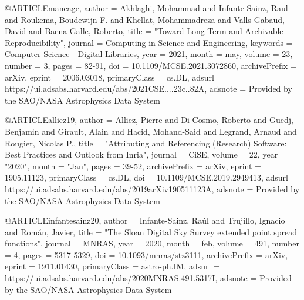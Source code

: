 %
%

@ARTICLE{maneage,
       author = {{Akhlaghi}, Mohammad and {Infante-Sainz}, Raul and
         {Roukema}, Boudewijn F. and {Khellat}, Mohammadreza and
         {Valls-Gabaud}, David and {Baena-Galle}, Roberto},
        title = "{Toward Long-Term and Archivable Reproducibility}",
      journal = {Computing in Science and Engineering},
     keywords = {Computer Science - Digital Libraries},
         year = 2021,
        month = may,
       volume = {23},
       number = {3},
        pages = {82-91},
          doi = {10.1109/MCSE.2021.3072860},
archivePrefix = {arXiv},
       eprint = {2006.03018},
 primaryClass = {cs.DL},
       adsurl = {https://ui.adsabs.harvard.edu/abs/2021CSE....23c..82A},
      adsnote = {Provided by the SAO/NASA Astrophysics Data System}
}




@ARTICLE{alliez19,
       author = {{Alliez}, Pierre and {Di Cosmo}, Roberto and {Guedj}, Benjamin and
         {Girault}, Alain and {Hacid}, Mohand-Said and {Legrand}, Arnaud and
         {Rougier}, Nicolas P.},
        title = "{Attributing and Referencing (Research) Software: Best Practices and Outlook from Inria}",
      journal = {CiSE},
       volume = {22},
         year = "2020",
        month = "Jan",
        pages = {39-52},
archivePrefix = {arXiv},
       eprint = {1905.11123},
 primaryClass = {cs.DL},
          doi = {10.1109/MCSE.2019.2949413},
       adsurl = {https://ui.adsabs.harvard.edu/abs/2019arXiv190511123A},
      adsnote = {Provided by the SAO/NASA Astrophysics Data System}
}





@ARTICLE{infantesainz20,
       author = {{Infante-Sainz}, Ra{\'u}l and {Trujillo}, Ignacio and
         {Rom{\'a}n}, Javier},
        title = "{The Sloan Digital Sky Survey extended point spread functions}",
      journal = {MNRAS},
         year = 2020,
        month = feb,
       volume = {491},
       number = {4},
        pages = {5317-5329},
          doi = {10.1093/mnras/stz3111},
archivePrefix = {arXiv},
       eprint = {1911.01430},
 primaryClass = {astro-ph.IM},
       adsurl = {https://ui.adsabs.harvard.edu/abs/2020MNRAS.491.5317I},
      adsnote = {Provided by the SAO/NASA Astrophysics Data System}
}





